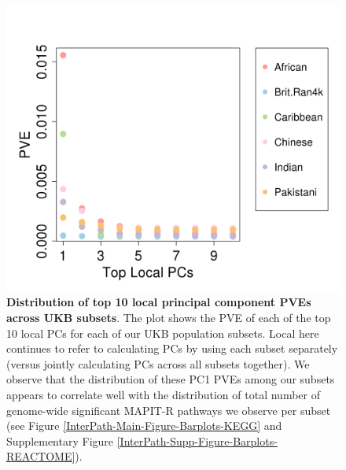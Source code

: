 \documentclass[12pt,a4paper]{article}
\begin{document}
\begin{figure}[htb]
\centering
\includegraphics[scale=.5]{Images/Main/InterPath_Main_Figure_Eigenvalues_vs2.png}
\caption[TBD]{\textbf{Distribution of top 10 local principal component PVEs across UKB subsets}. The plot shows the PVE of each of the top 10 local PCs for each of our UKB population subsets. Local here continues to refer to calculating PCs by using each subset separately (versus jointly calculating PCs across all subsets together). We observe that the distribution of these PC1 PVEs among our subsets appears to correlate well with the distribution of total number of genome-wide significant MAPIT-R pathways we observe per subset (see Figure \ref{InterPath-Main-Figure-Barplots-KEGG} and  Supplementary Figure \ref{InterPath-Supp-Figure-Barplots-REACTOME}).}
\label{InterPath-Main-Figure-Eigenvalues}
\end{figure}
\end{document}
